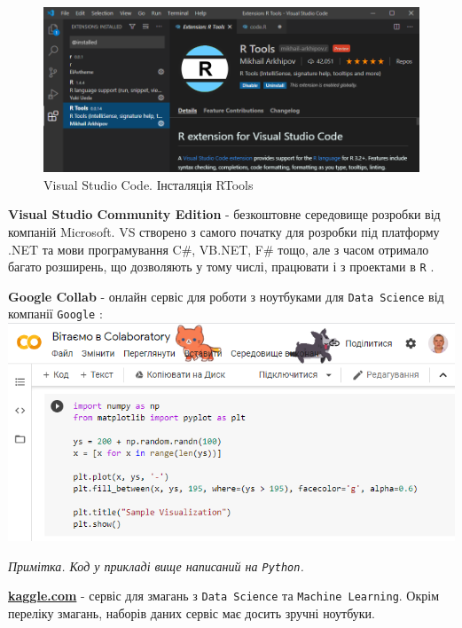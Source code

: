 \documentclass[
]{book}
\begin{document}
\begin{figure}
\centering
\includegraphics{images/chapter1/vs_code.png}
\caption{\label{fig:unnamed-chunk-28}Visual Studio Code. Інсталяція RTools}
\end{figure}

\textbf{Visual Studio Community Edition} - безкоштовне середовище розробки від компаній Microsoft. VS створено з самого початку для розробки під платформу .NET та мови програмування C\#, VB.NET, F\# тощо, але з часом отримало багато розширень, що дозволяють у тому числі, працювати і з проектами в \texttt{R} \citep{visual-studio}.

\textbf{Google Collab} - онлайн сервіс для роботи з ноутбуками для \texttt{Data\ Science} від компанії \texttt{Google} \citep{google-collab}:
\includegraphics{images/chapter1/google_collab.png}

\emph{Примітка. Код у прикладі вище написаний на \texttt{Python}.}

\href{https://kaggle.com}{\textbf{kaggle.com}} - сервіс для змагань з \texttt{Data\ Science} та \texttt{Machine\ Learning}. Окрім переліку змагань, наборів даних сервіс має досить зручні ноутбуки.
\end{document}
